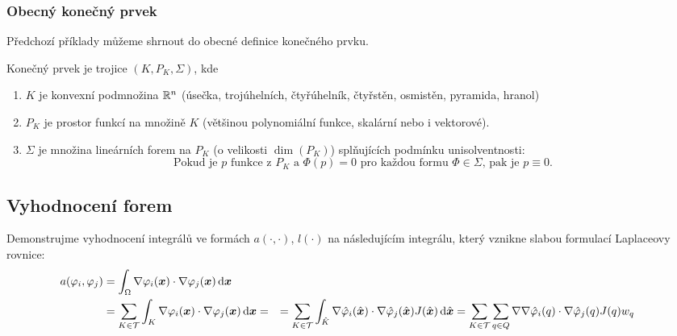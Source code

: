 \subsubsection{Obecný konečný prvek}
Předchozí příklady můžeme shrnout do obecné definice konečného prvku.
\begin{df}
Konečný prvek je trojice $(K, P_K, \Sigma)$, kde
\begin{enumerate}
 \item $K$ je konvexní podmnožina ${\mathbb R}^n$ (úsečka, trojúhelních, čtyřúhelník, čtyřstěn, osmistěn, pyramida, hranol)
 \item $P_K$ je prostor funkcí na množině $K$ (většinou polynomiální funkce, skalární nebo i vektorové). 
 \item $\Sigma$ je množina lineárních forem na $P_K$ (o velikosti $\dim(P_K)$) splňujících podmínku unisolventnosti:
 \[
    \text{Pokud je $p$ funkce z $P_K$ a $\Phi( p )=0$ pro každou formu $\Phi\in\Sigma$, pak je $p\equiv0$.}
 \]
\end{enumerate}
\end{df}


\subsection{Vyhodnocení forem}
Demonstrujme vyhodnocení integrálů ve formách $a(\cdot, \cdot)$, $l(\cdot)$ na následujícím integrálu, který vznikne slabou formulací Laplaceovy rovnice:
\begin{align*}
 a(\varphi_i, \varphi_j) &= \int_\Omega \nabla \varphi_i(\mathbf{\boldsymbol{x}}) \cdot \nabla \varphi_j(\mathbf{\boldsymbol{x}}) \,{\rm d} \mathbf{\boldsymbol{x}}\\
                   &= \sum_{K\in \mathcal T} \int_K  \nabla \varphi_i(\mathbf{\boldsymbol{x}}) \cdot \nabla \varphi_j(\mathbf{\boldsymbol{x}}) \,{\rm d} \mathbf{\boldsymbol{x}} =
                   &= \sum_{K\in \mathcal T} \int_{\hat K} \nabla \hat{\varphi}_i(\hat{\mathbf{\boldsymbol{x}}}) \cdot \nabla \hat {\varphi}_j(\hat{\mathbf{\boldsymbol{x}}}) J(\hat{\mathbf{\boldsymbol{x}}}) \,{\rm d} \hat{\mathbf{\boldsymbol{x}}}
                   &= \sum_{K\in \mathcal T} \sum_{q\in Q} \nabla \nabla \hat{\varphi}_i(q) \cdot \nabla \hat {\varphi}_j(q) J(q)w_q
\end{align*}




